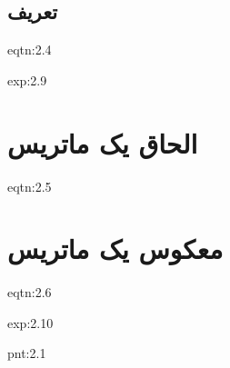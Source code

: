 \subsection{\textbf{تعریف}}
{
    \Large
    \begin{spacing}{1.5}

        \begin{eqtn}{eqtn:2.4}
            \centering

        \end{eqtn}

        \begin{example}{exp:2.9}
            \Large

        \end{example}

    \end{spacing}
}


\section{\textbf{الحاق یک ماتریس}}
\label{sec:2.6}
{
    \Large
    \begin{spacing}{1.5}

        \begin{eqtn}{eqtn:2.5}
            \centering

        \end{eqtn}
    \end{spacing}
}


\section{\textbf{معکوس یک ماتریس}}
\label{sec:2.7}
{
    \Large
    \begin{spacing}{1.5}
        \begin{enumerate}[label=\textbf{\arabic*}.]
        \end{enumerate}
        \begin{eqtn}{eqtn:2.6}
            \centering

        \end{eqtn}
        \begin{example}{exp:2.10}
            \Large

            \begin{point}{pnt:2.1}
                \Large

            \end{point}
        \end{example}
    \end{spacing}
}


